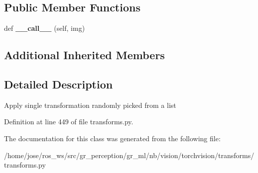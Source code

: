 \subsection*{Public Member Functions}
\begin{DoxyCompactItemize}
\item 
\mbox{\label{classtorchvision_1_1transforms_1_1transforms_1_1RandomChoice_a6386f8d899622d7ed15b42a0130163af}} 
def {\bfseries \+\_\+\+\_\+call\+\_\+\+\_\+} (self, img)
\end{DoxyCompactItemize}
\subsection*{Additional Inherited Members}


\subsection{Detailed Description}
\begin{DoxyVerb}Apply single transformation randomly picked from a list
\end{DoxyVerb}
 

Definition at line 449 of file transforms.\+py.



The documentation for this class was generated from the following file\+:\begin{DoxyCompactItemize}
\item 
/home/jose/ros\+\_\+ws/src/gr\+\_\+perception/gr\+\_\+ml/nb/vision/torchvision/transforms/transforms.\+py\end{DoxyCompactItemize}
